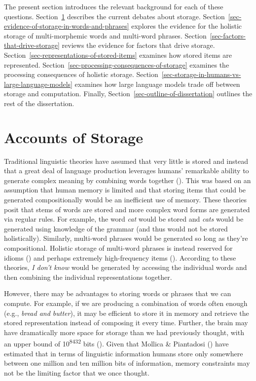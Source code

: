 \documentclass[
  12pt,
  letterpaper,
]{scrreport}
\begin{document}
The present section introduces the relevant background for each of these
questions. Section~\ref{sec-accounts-of-storage} describes the current
debates about storage.
Section~\ref{sec-evidence-of-storage-in-words-and-phrases} explores the
evidence for the holistic storage of multi-morphemic words and
multi-word phrases. Section~\ref{sec-factors-that-drive-storage} reviews
the evidence for factors that drive storage.
Section~\ref{sec-representations-of-stored-items} examines how stored
items are represented.
Section~\ref{sec-processing-consequences-of-storage} examines the
processing consequences of holistic storage.
Section~\ref{sec-storage-in-humans-vs-large-language-models} examines
how large language models trade off between storage and computation.
Finally, Section~\ref{sec-outline-of-dissertation} outlines the rest of
the dissertation.

\section{Accounts of Storage}\label{sec-accounts-of-storage}

Traditional linguistic theories have assumed that very little is stored
and instead that a great deal of language production leverages humans'
remarkable ability to generate complex meaning by combining words
together (). This was based on
an assumption that human memory is limited and that storing items that
could be generated compositionally would be an inefficient use of
memory. These theories posit that stems of words are stored and more
complex word forms are generated via regular rules. For example, the
word \emph{cat} would be stored and \emph{cats} would be generated using
knowledge of the grammar (and thus would not be stored holistically).
Similarly, multi-word phrases would be generated so long as they're
compositional. Holistic storage of multi-word phrases is instead
reserved for idioms () and
perhaps extremely high-frequency items (). According to these theories, \emph{I don't know}
would be generated by accessing the individual words and then combining
the individual representations together.

However, there may be advantages to storing words or phrases that we can
compute. For example, if we are producing a combination of words often
enough (e.g., \emph{bread and butter}), it may be efficient to store it
in memory and retrieve the stored representation instead of composing it
every time. Further, the brain may have dramatically more space for
storage than we had previously thought, with an upper bound of
10\textsuperscript{8432} bits
().
Given that Mollica \& Piantadosi
() have estimated
that in terms of linguistic information humans store only somewhere
between one million and ten million bits of information, memory
constraints may not be the limiting factor that we once thought.
\end{document}
